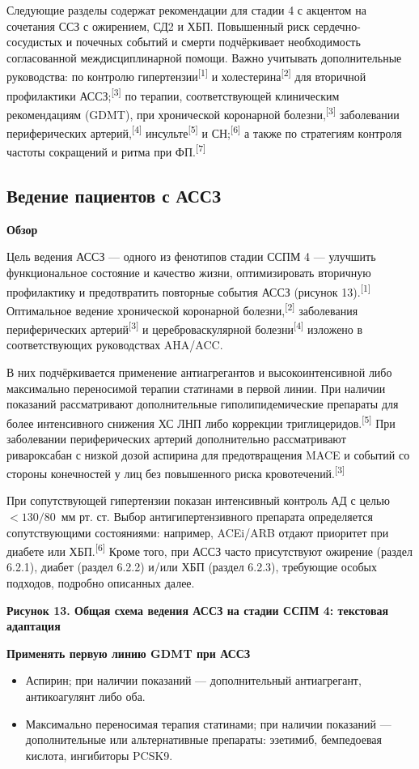 \documentclass[11pt,a4paper]{article}
\newcommand{\src}[1]{\textsuperscript{[#1]}}
\newcommand{\heading}[1]{\par\medskip\textbf{#1}\par}
\begin{document}
Следующие разделы содержат рекомендации для стадии 4 с акцентом на сочетания ССЗ с ожирением, СД2 и ХБП. Повышенный риск сердечно-сосудистых и почечных событий и смерти подчёркивает необходимость согласованной междисциплинарной помощи. Важно учитывать дополнительные руководства: по контролю гипертензии\src{1} и холестерина\src{2} для вторичной профилактики АССЗ;\src{3} по терапии, соответствующей клиническим рекомендациям (GDMT), при хронической коронарной болезни,\src{3} заболевании периферических артерий,\src{4} инсульте\src{5} и СН;\src{6} а также по стратегиям контроля частоты сокращений и ритма при ФП.\src{7}

\subsection{Ведение пациентов с АССЗ}
\heading{Обзор}
Цель ведения АССЗ --- одного из фенотипов стадии ССПМ 4 --- улучшить функциональное состояние и качество жизни, оптимизировать вторичную профилактику и предотвратить повторные события АССЗ (рисунок 13).\src{1} Оптимальное ведение хронической коронарной болезни,\src{2} заболевания периферических артерий\src{3} и цереброваскулярной болезни\src{4} изложено в соответствующих руководствах AHA/ACC.

В них подчёркивается применение антиагрегантов и высокоинтенсивной либо максимально переносимой терапии статинами в первой линии. При наличии показаний рассматривают дополнительные гиполипидемические препараты для более интенсивного снижения ХС ЛНП либо коррекции триглицеридов.\src{5} При заболевании периферических артерий дополнительно рассматривают ривароксабан с низкой дозой аспирина для предотвращения MACE и событий со стороны конечностей у лиц без повышенного риска кровотечений.\src{3}

При сопутствующей гипертензии показан интенсивный контроль АД с целью $<130/80$~мм рт. ст. Выбор антигипертензивного препарата определяется сопутствующими состояниями: например, ACEi/ARB отдают приоритет при диабете или ХБП.\src{6} Кроме того, при АССЗ часто присутствуют ожирение (раздел 6.2.1), диабет (раздел 6.2.2) и/или ХБП (раздел 6.2.3), требующие особых подходов, подробно описанных далее.

\heading{Рисунок 13. Общая схема ведения АССЗ на стадии ССПМ 4: текстовая адаптация}
\heading{Применять первую линию GDMT при АССЗ}
\begin{itemize}
\item Аспирин; при наличии показаний --- дополнительный антиагрегант, антикоагулянт либо оба.
\item Максимально переносимая терапия статинами; при наличии показаний --- дополнительные или альтернативные препараты: эзетимиб, бемпедоевая кислота, ингибиторы PCSK9.
\end{itemize}
\end{document}
